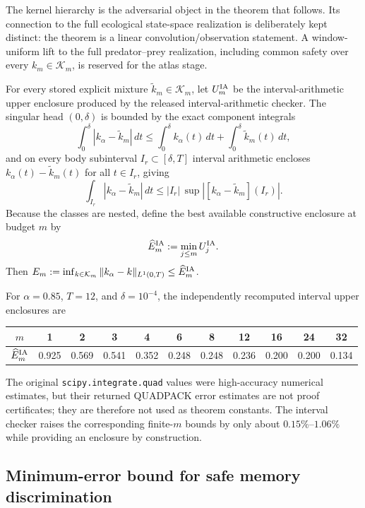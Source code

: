 The kernel hierarchy is the adversarial object in the theorem that follows.  Its connection to the full ecological state-space realization is deliberately kept distinct: the theorem is a linear convolution/observation statement.  A window-uniform lift to the full predator--prey realization, including common safety over every $k_m\in\mathcal K_m$, is reserved for the atlas stage.

\begin{definition}
For every stored explicit mixture $\widetilde k_m\in\mathcal K_m$, let $U_m^{\rm IA}$ be the interval-arithmetic upper enclosure produced by the released interval-arithmetic checker.  The singular head $(0,\delta)$ is bounded by the exact component integrals
\[
\int_0^\delta |k_\alpha-\widetilde k_m|\,dt
\le
\int_0^\delta k_\alpha(t)\,dt+\int_0^\delta \widetilde k_m(t)\,dt,
\]
and on every body subinterval $I_r\subset[\delta,T]$ interval arithmetic encloses $k_\alpha(t)-\widetilde k_m(t)$ for all $t\in I_r$, giving
\[
\int_{I_r}|k_\alpha-\widetilde k_m|\,dt
\le |I_r|\,\sup |[k_\alpha-\widetilde k_m](I_r)|.
\]
Because the classes are nested, define the best available constructive enclosure at budget $m$ by
\[
\widehat E_m^{\rm IA}:=\min_{j\le m}U_j^{\rm IA}.
\]
Then $E_m:=\inf_{k\in\mathcal K_m}\|k_\alpha-k\|_{L^1(0,T)}\le \widehat E_m^{\rm IA}$.
\end{definition}

For $\alpha=0.85$, $T=12$, and $\delta=10^{-4}$, the independently recomputed interval upper enclosures are
\begin{center}\small
\begin{tabular}{c|cccccccccc}
$m$ & 1&2&3&4&6&8&12&16&24&32\\
\hline
$\widehat E_m^{\rm IA}$ & 0.925&0.569&0.541&0.352&0.248&0.248&0.236&0.200&0.200&0.134
\end{tabular}
\end{center}
The original \texttt{scipy.integrate.quad} values were high-accuracy numerical estimates, but their returned QUADPACK error estimates are not proof certificates; they are therefore not used as theorem constants.  The interval checker raises the corresponding finite-$m$ bounds by only about $0.15\%$--$1.06\%$ while providing an enclosure by construction.

\subsection{Minimum-error bound for safe memory discrimination}

